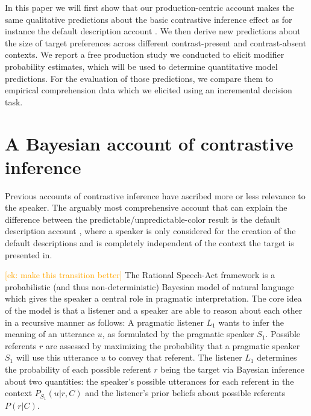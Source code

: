 \documentclass[10pt,letterpaper]{article}
\newcommand{\ek}[1]{\textcolor{Orange}{[ek: #1]}}
\begin{document}
In this paper we will first show that our production-centric account makes the same qualitative predictions about the basic contrastive inference effect as for instance the default description account \cite{Sedivy:2003}. We then derive new predictions about the size of target preferences across different contrast-present and contrast-absent contexts. We report a free production study we conducted to elicit modifier probability estimates, which will be used to determine quantitative model predictions. For the evaluation of those predictions, we compare them to empirical comprehension data which we elicited using an incremental decision task.


\section{A Bayesian account of contrastive inference}

Previous accounts of contrastive inference have ascribed more or less relevance to the speaker. The arguably most comprehensive account that can explain the difference between the predictable/unpredictable-color result is the default description account \cite{Sedivy:1999}, where a speaker is only considered for the creation of the default descriptions and is completely independent of the context the target is presented in. 

\ek{make this transition better}
The Rational Speech-Act framework \cite{Frank:2012,Goodman:2016} is a probabilistic (and thus non-deterministic) Bayesian model of natural language which gives the speaker a central role in pragmatic interpretation. The core idea of the model is that a listener and a speaker are able to reason about each other in a recursive manner as follows: A pragmatic listener $L_1$ wants to infer the meaning of an utterance $u$, as formulated by the pragmatic speaker $S_1$. Possible referents $r$ are assessed by maximizing the probability that a pragmatic speaker $S_1$ will use this utterance $u$ to convey that referent.
The listener $L_1$ determines the probability of each possible referent $r$ being the target via Bayesian inference about two quantities: the speaker's possible utterances for each referent in the context $P_{S_1}(u|r,C)$ and the listener's prior beliefs about possible referents $P(r|C)$. 

\end{document}
